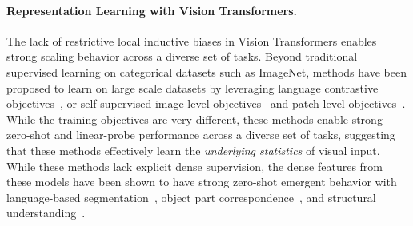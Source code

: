 \documentclass{article}
\newcommand{\myparagraph}[1]{\vspace{-2pt}\paragraph{#1}}
\begin{document}
\myparagraph{Representation Learning with Vision Transformers.} The lack of restrictive local inductive biases in Vision Transformers enables strong scaling behavior across a diverse set of tasks. Beyond traditional supervised learning on categorical datasets such as ImageNet, methods have been proposed to learn on large scale datasets by leveraging language contrastive objectives~\citep{Radford2021LearningTV,yu2022coca}, or self-supervised image-level objectives~\citep{caron2021emerging,chen2021mocov3,li2021esvit} and patch-level objectives~\citep{trinh2019selfieselfsupervisedpretrainingimage,pmlr-v119-chen20s,xie2021simmim,MaskedAutoencoders2021,zhou2021ibot,bao2022beit,assran2023self,oquab2023dinov2}. While the training objectives are very different, these methods enable strong zero-shot and linear-probe performance across a diverse set of tasks, suggesting that these methods effectively learn the \emph{underlying statistics} of visual input. While these methods lack explicit dense supervision, the dense features from these models have been shown to have strong zero-shot emergent behavior with language-based segmentation~\cite{zhou2022extract}, object part correspondence~\citep{amir2021deep}, and structural understanding~\citep{Ranzinger_2024_CVPR}.
\end{document}
